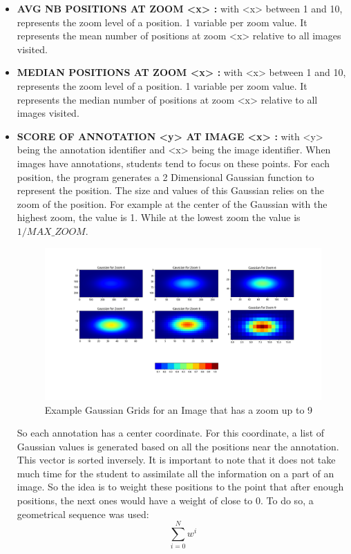 \documentclass[a4paper,11pt]{report}
\numberwithin{figure}{section} %
\begin{document}
\begin{itemize}
    \item[\textbullet] \textbf{AVG NB POSITIONS AT ZOOM <x> :} with <x> between 1 and 10, represents the zoom level of a position.
    1 variable per zoom value.
    It represents the mean number of positions at zoom <x> relative to all images visited.\\
    \item[\textbullet] \textbf{MEDIAN POSITIONS AT ZOOM <x> :} with <x> between 1 and 10, represents the zoom level of a position.
    1 variable per zoom value.
    It represents the median number of positions at zoom <x> relative to all images visited.\\
    \item[\textbullet] \label{enum:score} \textbf{SCORE OF ANNOTATION <y> AT IMAGE <x> :} with <y> being the annotation identifier and <x> being the image identifier.
    When images have annotations, students tend to focus on these points.
    For each position, the program generates a 2 Dimensional Gaussian function to represent the position.
    The size and values of this Gaussian relies on the zoom of the position.
    For example at the center of the Gaussian with the highest zoom, the value is 1.
    While at the lowest zoom the value is $1/MAX\_ZOOM$.
    \begin{figure}[H]
\begin{center}
\includegraphics[scale=0.35]{plots/gaussian.png}
\caption{Example Gaussian Grids for an Image that has a zoom up to 9}
\end{center}
\end{figure}

   So each annotation has a center coordinate.
   For this coordinate, a list of Gaussian values is generated based on all the positions near the annotation.
   This vector is sorted inversely.
   It is important to note that it does not take much time for the student to assimilate all the information on a part of an image.
   So the idea is to weight these positions to the point that after enough positions, the next ones would have a weight of close to 0.
To do so, a geometrical sequence was used:
	\[\sum\limits_{i=0}^N w^i\]


\end{itemize}
\end{document}
